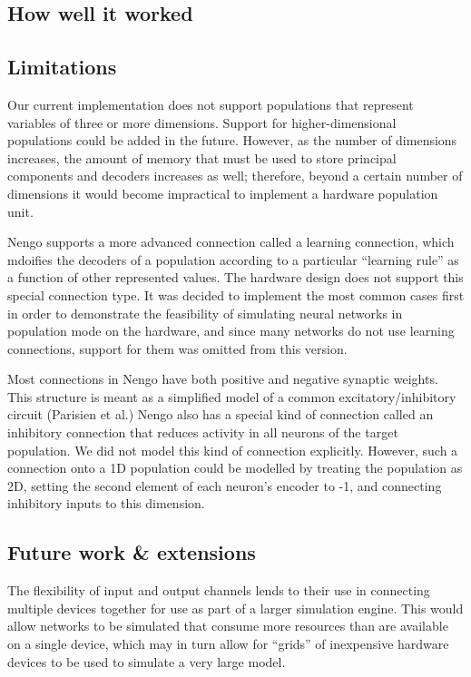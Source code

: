 \documentclass[english]{article}
\begin{document}
\subsection{How well it worked}

\subsection{Limitations}

Our current implementation does not support populations that represent variables of three or more dimensions.
Support for higher-dimensional populations could be added in the future.
However, as the number of dimensions increases, the
amount of memory that must be used to store principal components and
decoders increases as well; therefore, beyond a certain number of
dimensions it would become impractical to implement a hardware
population unit.  

Nengo supports a more advanced connection called a learning connection,
which mdoifies the decoders of a population according to a particular ``learning rule''
as a function of other represented values. The hardware design does not support this special connection type.
It was decided to implement the most common cases first in order to demonstrate the feasibility of simulating
neural networks in population mode on the hardware, and since many networks do not use learning connections,
support for them was omitted from this version.

Most connections in Nengo have both positive and negative synaptic weights. This
structure is meant as a simplified model of a common excitatory/inhibitory circuit
(Parisien et al.) %
Nengo also has a special kind of connection called an inhibitory connection that
reduces activity in all neurons of the target population. We did not model this kind of connection explicitly.
However, such a connection onto a 1D population could be modelled by treating the population as 2D,
setting the second element of each neuron's encoder to -1, and connecting inhibitory inputs to this dimension.


\subsection{Future work \& extensions}


The flexibility of input and output channels lends to their use in connecting multiple devices together for use as part of a larger simulation engine.
This would allow networks to be simulated that consume more resources than are available on a single device, which may in turn allow
for ``grids'' of inexpensive hardware devices to be used to simulate a very large model.
\end{document}
